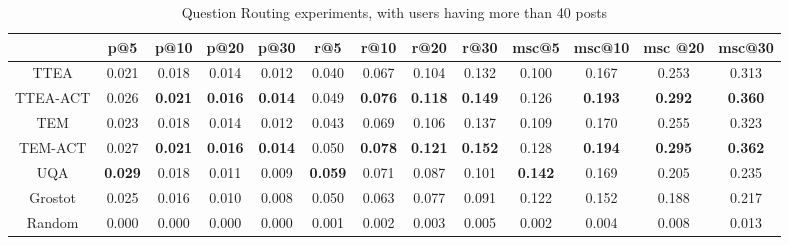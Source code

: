 {{{{{{{\begin{sidewaystable}
\caption{Question Routing experiments, with users having more than 40 posts}
\label{tab:qroutingfilter40}
\centering
\begin{tabular}{|c|c|c|c|c|c|c|c|c|c|c|c|c|}
\hline
 & p@5    &p@10    &p@20   & p@30 &r@5 & r@10 & r@20 &r@30 & msc@5 & msc@10 &msc @20 &msc@30  \\ \hline
TTEA&0.021&0.018&0.014&0.012&0.040&0.067&0.104&0.132&0.100&0.167&0.253&0.313 \\ \hline
TTEA-ACT&0.026&\textbf{0.021}&\textbf{0.016}&\textbf{0.014}&0.049&\textbf{0.076}&\textbf{0.118}&\textbf{0.149}&0.126&\textbf{0.193}&\textbf{0.292}&\textbf{0.360} \\ \hline
TEM&0.023&0.018&0.014&0.012&0.043&0.069&0.106&0.137&0.109&0.170&0.255&0.323 \\ \hline
TEM-ACT&0.027&\textbf{0.021}&\textbf{0.016}&\textbf{0.014}&0.050&\textbf{0.078}&\textbf{0.121}&\textbf{0.152}&0.128&\textbf{0.194}&\textbf{0.295}&\textbf{0.362} \\ \hline
UQA&\textbf{0.029}&0.018&0.011&0.009&\textbf{0.059}&0.071&0.087&0.101&\textbf{0.142}&0.169&0.205&0.235 \\ \hline
Grostot&0.025&0.016&0.010&0.008&0.050&0.063&0.077&0.091&0.122&0.152&0.188&0.217 \\ \hline
Random&0.000&0.000&0.000&0.000&0.001&0.002&0.003&0.005&0.002&0.004&0.008&0.013 \\ \hline
\end{tabular}
\end{sidewaystable}


}}}}}}}
